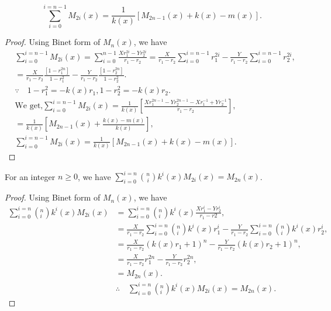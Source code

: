 \begin{theorem}
\begin{equation}
\sum_{i=0}^{i=n-1}M_{2i}(x)=\frac{1}{k(x)}[M_{2n-1}(x)+k(x)-m(x)].
\end{equation}
\end{theorem}
\begin{proof}
Using Binet form of $M_{n}(x)$, we have
\begin{align*}
&\sum_{i=0}^{i=n-1}M_{2i}(x)=\sum_{i=0}^{n-1}\frac{Xr_{1}^{2i}-Yr_{2}^{2i}}{r_{1}-r_{2}}=\frac{X}{r_{1}-r_{2}}\sum_{i=0}^{i=n-1}r_{1}^{2i}-\frac{Y}{r_{1}-r_{2}}\sum_{i=0}^{i=n-1}r_{2}^{2i},\\
&=\frac{X}{r_{1}-r_{2}}\frac{[1-r_{1}^{2n}]}{1-r_{1}^2}-\frac{Y}{r_{1}-r_{2}}\frac{[1-r_{2}^{2n}]}{1-r_{2}^2}.\\
&\because\quad
1-r_{1}^2=-k(x)r_{1},
1-r_{2}^2=-k(x)r_{2}.\\
&\text{We get,}
\sum_{i=0}^{i=n-1}M_{2i}(x)=\frac{1}{k(x)}[\frac{Xr_{1}^{2n-1}-Yr_{2}^{2n-1}-Xr_{1}^{-1}+Yr_{2}^{-1}}{r_{1}-r_{2}}],\\
&=\frac{1}{k(x)}[M_{2n-1}(x)+\frac{k(x)-m(x)}{k(x)}],\\
&\sum_{i=0}^{i=n-1}M_{2i}(x)=\frac{1}{k(x)}[M_{2n-1}(x)+k(x)-m(x)].
\end{align*}
\end{proof}
\begin{theorem}
For an integer $n\geq0$, we have
$\displaystyle\sum_{i=0}^{i=n}\binom {n}{i}k^i(x)M_{2i}(x)=M_{2n}(x)$.
\end{theorem}
\begin{proof}
Using Binet form of $M_{n}(x)$, we have
\begin{align*}
\displaystyle\sum_{i=0}^{i=n}\left(^{n} _{i} \right)k^i(x)M_{2i}(x)
&=\displaystyle\sum_{i=0}^{i=n}\left(^{n} _{i} \right)k^i(x)\frac{Xr_{1}^i-Yr_{2}^i}{r_{1}-r{2}},\\
&=\frac{X}{r_{1}-r_{2}}\displaystyle\sum_{i=0}^{i=n}\left(^{n} _{i} \right)k^i(x)r_{1}^i-\frac{Y}{r_{1}-r_{2}}\sum_{i=0}^{i=n}\left(^{n} _{i} \right)k^i(x)r_{2}^i,\\
&=\frac{X}{r_{1}-r_{2}}(k(x)r_{1}+1)^n-\frac{Y}{r_{1}-r_{2}}(k(x)r_{2}+1)^n,\\
&=\frac{X}{r_{1}-r_{2}}r_{1}^{2n}-\frac{Y}{r_{1}-r_{2}}r_{2}^{2n},\\
&=M_{2n}(x).\\
&\therefore\quad\displaystyle\sum_{i=0}^{i=n}\left(^{n} _{i} \right)k^i(x)M_{2i}(x)=M_{2n}(x).
\end{align*}
\end{proof}
